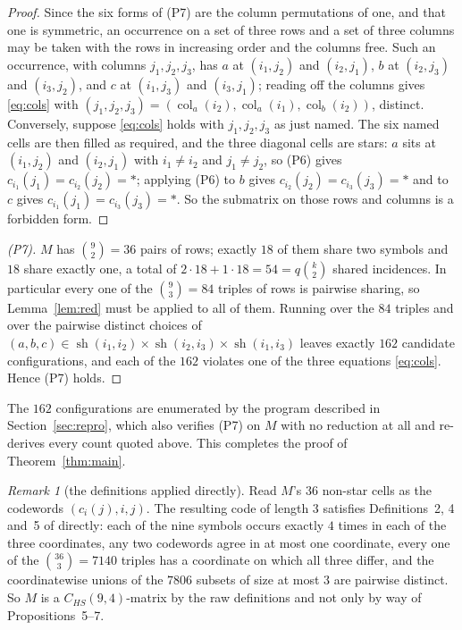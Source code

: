 \documentclass[11pt]{amsart}
\theoremstyle{definition}
\theoremstyle{remark}
\newtheorem*{remark}{Remark}
\DeclareMathOperator{\col}{col}
\newcommand{\sh}{\operatorname{sh}}
\newcommand{\st}{\ast}
\begin{document}
\begin{proof}
Since the six forms of (P7) are the column permutations of one, and that one is
symmetric, an occurrence on a set of three rows and a set of three columns may
be taken with the rows in increasing order and the columns free. Such an
occurrence, with columns $j_1,j_2,j_3$, has $a$ at $(i_1,j_2)$ and $(i_2,j_1)$,
$b$ at $(i_2,j_3)$ and $(i_3,j_2)$, and $c$ at $(i_1,j_3)$ and $(i_3,j_1)$;
reading off the columns gives \eqref{eq:cols} with
$(j_1,j_2,j_3)=(\col_a(i_2),\col_a(i_1),\col_b(i_2))$, distinct. Conversely,
suppose \eqref{eq:cols} holds with $j_1,j_2,j_3$ as just named. The six named
cells are then filled as required, and the three diagonal cells are stars: $a$
sits at $(i_1,j_2)$ and $(i_2,j_1)$ with $i_1\ne i_2$ and $j_1\ne j_2$, so (P6)
gives $c_{i_1}(j_1)=c_{i_2}(j_2)=\st$; applying (P6) to $b$ gives
$c_{i_2}(j_2)=c_{i_3}(j_3)=\st$ and to $c$ gives
$c_{i_1}(j_1)=c_{i_3}(j_3)=\st$. So the submatrix on those rows and columns is
a forbidden form.
\end{proof}

\begin{proof}[(P7)]
$M$ has $\binom92=36$ pairs of rows; exactly $18$ of them share two symbols and
$18$ share exactly one, a total of $2\cdot18+1\cdot18=54=q\binom k2$ shared
incidences. In particular every one of the $\binom93=84$ triples of rows is
pairwise sharing, so Lemma~\ref{lem:red} must be applied to all of them. Running
over the $84$ triples and over the pairwise distinct choices of
$(a,b,c)\in\sh(i_1,i_2)\times\sh(i_2,i_3)\times\sh(i_1,i_3)$ leaves exactly
$162$ candidate configurations, and each of the $162$ violates one of the three
equations \eqref{eq:cols}. Hence (P7) holds.
\end{proof}

The $162$ configurations are enumerated by the program described in
Section~\ref{sec:repro}, which also verifies (P7) on $M$ with no reduction at
all and re-derives every count quoted above. This completes the proof of
Theorem~\ref{thm:main}.

\begin{remark}[the definitions applied directly]
Read $M$'s $36$ non-star cells as the codewords $(c_i(j),i,j)$. The resulting
code of length $3$ satisfies Definitions~2, 4 and~5 of \cite{Dya} directly:
each of the nine symbols occurs exactly $4$ times in each of the three
coordinates, any two codewords agree in at most one coordinate, every one of the
$\binom{36}3=7140$ triples has a coordinate on which all three differ, and the
coordinatewise unions of the $7806$ subsets of size at most $3$ are pairwise
distinct. So $M$ is a $C_{HS}(9,4)$-matrix by the raw definitions and not only
by way of Propositions~5--7.
\end{remark}
\end{document}
